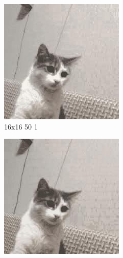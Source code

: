 \documentclass[12pt,a4paper]{article}
\begin{document}
\begin{figure}[htb]
\medskip
\begin{subfigure}{0.25\textwidth}
  \includegraphics[width=\linewidth]{images/small/16-16-50-1}
  \caption{16x16 50 1}
  \label{fig:4}
\end{subfigure}\hfil %
\begin{subfigure}{0.25\textwidth}
  \includegraphics[width=\linewidth]{images/small/16-16-100-05}

\end{subfigure}
\end{figure}
\end{document}
